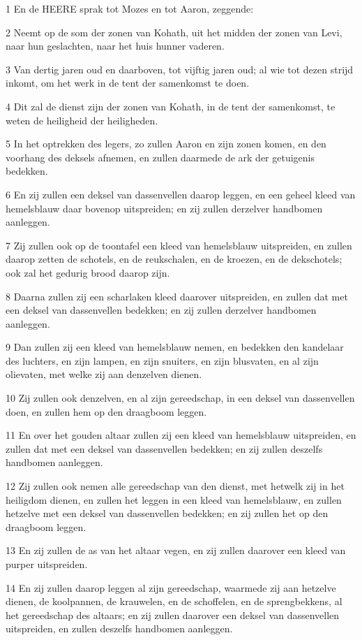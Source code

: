 \par 1 En de HEERE sprak tot Mozes en tot Aaron, zeggende:
\par 2 Neemt op de som der zonen van Kohath, uit het midden der zonen van Levi, naar hun geslachten, naar het huis hunner vaderen.
\par 3 Van dertig jaren oud en daarboven, tot vijftig jaren oud; al wie tot dezen strijd inkomt, om het werk in de tent der samenkomst te doen.
\par 4 Dit zal de dienst zijn der zonen van Kohath, in de tent der samenkomst, te weten de heiligheid der heiligheden.
\par 5 In het optrekken des legers, zo zullen Aaron en zijn zonen komen, en den voorhang des deksels afnemen, en zullen daarmede de ark der getuigenis bedekken.
\par 6 En zij zullen een deksel van dassenvellen daarop leggen, en een geheel kleed van hemelsblauw daar bovenop uitspreiden; en zij zullen derzelver handbomen aanleggen.
\par 7 Zij zullen ook op de toontafel een kleed van hemelsblauw uitspreiden, en zullen daarop zetten de schotels, en de reukschalen, en de kroezen, en de dekschotels; ook zal het gedurig brood daarop zijn.
\par 8 Daarna zullen zij een scharlaken kleed daarover uitspreiden, en zullen dat met een deksel van dassenvellen bedekken; en zij zullen derzelver handbomen aanleggen.
\par 9 Dan zullen zij een kleed van hemelsblauw nemen, en bedekken den kandelaar des luchters, en zijn lampen, en zijn snuiters, en zijn blusvaten, en al zijn olievaten, met welke zij aan denzelven dienen.
\par 10 Zij zullen ook denzelven, en al zijn gereedschap, in een deksel van dassenvellen doen, en zullen hem op den draagboom leggen.
\par 11 En over het gouden altaar zullen zij een kleed van hemelsblauw uitspreiden, en zullen dat met een deksel van dassenvellen bedekken; en zij zullen deszelfs handbomen aanleggen.
\par 12 Zij zullen ook nemen alle gereedschap van den dienst, met hetwelk zij in het heiligdom dienen, en zullen het leggen in een kleed van hemelsblauw, en zullen hetzelve met een deksel van dassenvellen bedekken; en zij zullen het op den draagboom leggen.
\par 13 En zij zullen de as van het altaar vegen, en zij zullen daarover een kleed van purper uitspreiden.
\par 14 En zij zullen daarop leggen al zijn gereedschap, waarmede zij aan hetzelve dienen, de koolpannen, de krauwelen, en de schoffelen, en de sprengbekkens, al het gereedschap des altaars; en zij zullen daarover een deksel van dassenvellen uitspreiden, en zullen deszelfs handbomen aanleggen.
